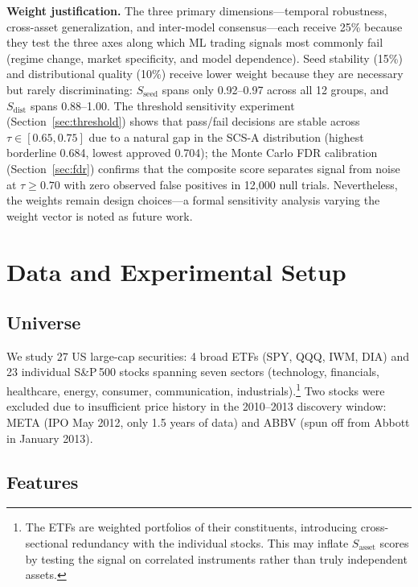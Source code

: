 \documentclass[12pt,a4paper]{article}
\begin{document}
\textbf{Weight justification.} The three primary dimensions---temporal robustness, cross-asset generalization, and inter-model consensus---each receive 25\% because they test the three axes along which ML trading signals most commonly fail (regime change, market specificity, and model dependence). Seed stability (15\%) and distributional quality (10\%) receive lower weight because they are necessary but rarely discriminating: $S_{\text{seed}}$ spans only 0.92--0.97 across all 12 groups, and $S_{\text{dist}}$ spans 0.88--1.00. The threshold sensitivity experiment (Section~\ref{sec:threshold}) shows that pass/fail decisions are stable across $\tau \in [0.65, 0.75]$ due to a natural gap in the SCS-A distribution (highest borderline 0.684, lowest approved 0.704); the Monte Carlo FDR calibration (Section~\ref{sec:fdr}) confirms that the composite score separates signal from noise at $\tau \geq 0.70$ with zero observed false positives in 12{,}000 null trials. Nevertheless, the weights remain design choices---a formal sensitivity analysis varying the weight vector is noted as future work.


\section{Data and Experimental Setup}
\label{sec:data}

\subsection{Universe}

We study 27 US large-cap securities: 4 broad ETFs (SPY, QQQ, IWM, DIA) and 23 individual S\&P\,500 stocks spanning seven sectors (technology, financials, healthcare, energy, consumer, communication, industrials).\footnote{The ETFs are weighted portfolios of their constituents, introducing cross-sectional redundancy with the individual stocks. This may inflate $S_{\text{asset}}$ scores by testing the signal on correlated instruments rather than truly independent assets.} Two stocks were excluded due to insufficient price history in the 2010--2013 discovery window: META (IPO May 2012, only 1.5 years of data) and ABBV (spun off from Abbott in January 2013).

\subsection{Features}
\end{document}
